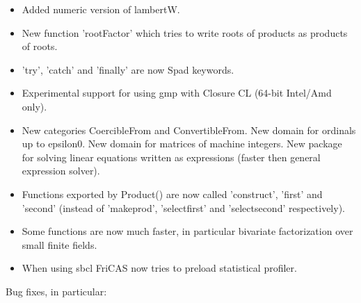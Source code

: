 \begin{itemize}
\item Added numeric version of lambertW.

\item New function 'rootFactor' which tries to write roots of products
  as products of roots.

\item 'try', 'catch' and 'finally' are now Spad keywords.

\item Experimental support for using gmp with Closure CL (64-bit
  Intel/Amd only).

\item New categories CoercibleFrom and ConvertibleFrom. New domain for
  ordinals up to epsilon0. New domain for matrices of machine
  integers. New package for solving linear equations written as
  expressions (faster then general expression solver).

\item Functions exported by Product() are now called 'construct',
  'first' and 'second' (instead of 'makeprod', 'selectfirst' and
  'selectsecond' respectively).

\item Some functions are now much faster, in particular bivariate
  factorization over small finite fields.

\item When using sbcl FriCAS now tries to preload statistical
  profiler.
\end{itemize}

Bug fixes, in particular:


